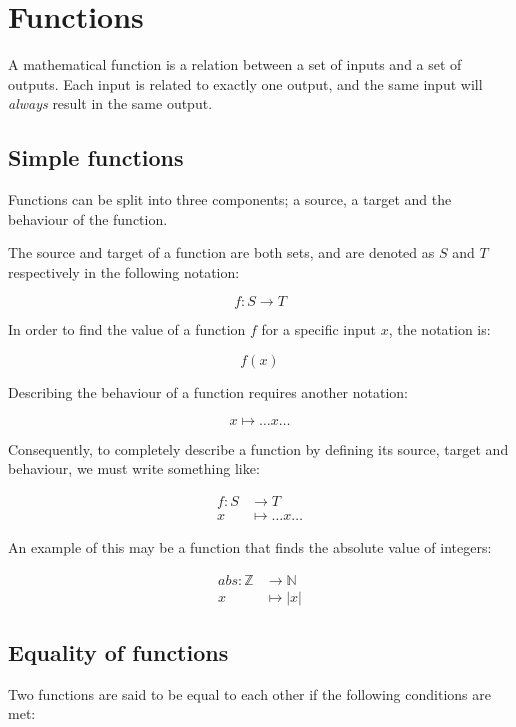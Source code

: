 
\section{Functions}

A mathematical function is a relation between a set of inputs and a set of
outputs. Each input is related to exactly one output, and the same input will
{\it always} result in the same output.

\subsection{Simple functions}

Functions can be split into three components; a source, a target and the
behaviour of the function.

The source and target of a function are both sets, and are denoted as $S$ and
$T$ respectively in the following notation:

\[
	f:S \rightarrow T
\]

In order to find the value of a function $f$ for a specific input $x$, the
notation is:

\[
	f(x)
\]

Describing the behaviour of a function requires another notation:

\[
	x \longmapsto \dots x \dots
\]

Consequently, to completely describe a function by defining its source, target
and behaviour, we must write something like:

\[
	\begin{split}
	f:S &\rightarrow T\\
	x &\longmapsto \dots x \dots
	\end{split}
\]

An example of this may be a function that finds the absolute value of integers:

\[
	\begin{split}
	abs:\mathbb{Z} &\rightarrow \mathbb{N}\\
	x &\longmapsto |x|
	\end{split}	
\]

\subsection{Equality of functions}

Two functions are said to be equal to each other if the following conditions are
met:

